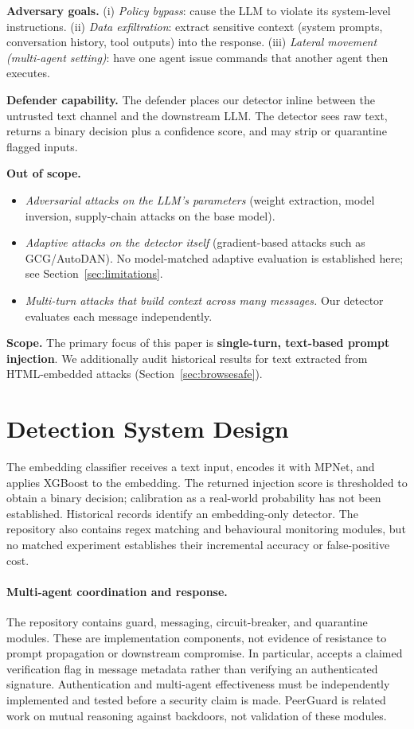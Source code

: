 \documentclass[11pt, a4paper]{article}
\begin{document}
\textbf{Adversary goals.} (i) \emph{Policy bypass}: cause the LLM to
violate its system-level instructions. (ii) \emph{Data exfiltration}:
extract sensitive context (system prompts, conversation history, tool
outputs) into the response. (iii) \emph{Lateral movement (multi-agent
setting)}: have one agent issue commands that another agent then executes.

\textbf{Defender capability.} The defender places our detector inline
between the untrusted text channel and the downstream LLM. The detector
sees raw text, returns a binary decision plus a confidence score, and may
strip or quarantine flagged inputs.

\textbf{Out of scope.}
\begin{itemize}
    \item \emph{Adversarial attacks on the LLM's parameters} (weight
          extraction, model inversion, supply-chain attacks on the base
          model).
    \item \emph{Adaptive attacks on the detector itself} (gradient-based
          attacks such as GCG/AutoDAN). No model-matched adaptive evaluation is established here; see
          Section~\ref{sec:limitations}.
    \item \emph{Multi-turn attacks that build context across many
          messages.} Our detector evaluates each message independently.
\end{itemize}

\textbf{Scope.} The primary focus of this paper is \textbf{single-turn,
text-based prompt injection}. We additionally audit historical results for text extracted
from HTML-embedded attacks (Section~\ref{sec:browsesafe}).

\section{Detection System Design}
\label{sec:design}

The embedding classifier receives a text input, encodes it with MPNet,
and applies XGBoost to the embedding. The returned injection score is
thresholded to obtain a binary decision; calibration as a real-world
probability has not been established. Historical records identify an
embedding-only detector. The repository also contains regex matching and
behavioural monitoring modules, but no matched experiment establishes their
incremental accuracy or false-positive cost.

\paragraph{Multi-agent coordination and response.}
The repository contains guard, messaging, circuit-breaker, and quarantine
modules. These are implementation components, not evidence of resistance
to prompt propagation or downstream compromise. In particular,
 accepts a claimed verification flag
in message metadata rather than verifying an authenticated signature. Authentication and
multi-agent effectiveness must be independently implemented and tested
before a security claim is made. PeerGuard \citep{fan2025peerguard}
is related work on mutual reasoning against backdoors, not validation of
these modules.
\end{document}
